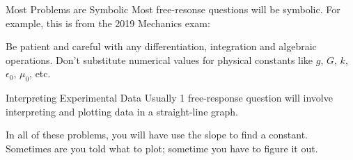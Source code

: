\documentclass[12pt,aspectratio=169]{beamer}
\begin{document}
%    
%
%

\begin{frame}{Most Problems are Symbolic}
  Most free-resonse questions will be symbolic. For example, this is from the
  2019 Mechanics exam:
  \begin{center}
  \end{center}
  Be patient and careful with any differentiation, integration and algebraic
  operations. Don't substitute numerical values for physical constants like
  $g$, $G$, $k$, $\epsilon_0$, $\mu_0$, etc.
\end{frame}



\begin{frame}{Interpreting Experimental Data}
  Usually 1 free-response question will involve interpreting and
  plotting data in a straight-line graph.
  \begin{center}
  \end{center}
  In all of these problems, you will have use the slope to find a constant.
  Sometimes are you told what to plot; sometime you have to figure it out.
\end{frame}
\end{document}
